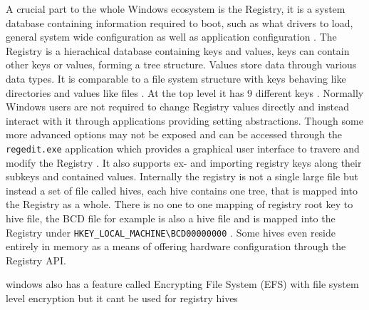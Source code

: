 A crucial part to the whole Windows ecosystem is the Registry, it is a system database containing information required to boot, such as what drivers to load, general system wide configuration as well as application configuration \cite[Section 1]{windows-internals-7-part1}.
The Registry is a hierachical database containing keys and values, keys can contain other keys or values, forming a tree structure.
Values store data through various data types.
It is comparable to a file system structure with keys behaving like directories and values like files \cite[Section 10]{windows-internals-7-part2}.
At the top level it has 9 different keys \cite[Section 10]{windows-internals-7-part2}.
Normally Windows users are not required to change Registry values directly and instead interact with it through applications providing setting abstractions.
Though some more advanced options may not be exposed and can be accessed through the \lstinline{regedit.exe} application which provides a graphical user interface to travere and modify the Registry \cite[Section 10]{windows-internals-7-part2}.
It also supports ex- and importing registry keys along their subkeys and contained values.
Internally the registry is not a single large file but instead a set of file called hives, each hive contains one tree, that is mapped into the Registry as a whole.
There is no one to one mapping of registry root key to hive file, the \ac{BCD} file for example is also a hive file and is mapped into the Registry under \lstinline{HKEY_LOCAL_MACHINE\BCD00000000} \cite[Section 10]{windows-internals-7-part2}.
Some hives even reside entirely in memory as a means of offering hardware configuration through the Registry \ac{API}.

windows also has a feature called Encrypting File System (EFS) with file system level encryption but it cant be used for registry hives
\cite[Section 9]{windows-internals-6-part2}


